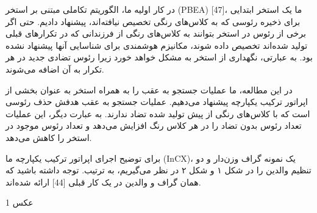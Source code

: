 \documentclass[a4paper,10pt]{article}
\begin{document}
                در کار اولیه ما، الگوریتم تکاملی مبتنی بر استخر (PBEA) [47]، ما یک استخر ابتدایی برای ذخیره رئوسی که به کلاس‌های رنگی تخصیص نیافته‌اند، پیشنهاد دادیم. حتی اگر برخی از رئوس در استخر بتوانند به کلاس‌های رنگی از فرزندانی که در تکرارهای قبلی تولید شده‌اند تخصیص داده شوند، مکانیزم هوشمندی برای شناسایی آنها پیشنهاد نشده بود. به عبارتی، نگهداری از استخر به مشکل خواهد خورد زیرا رئوس تضادی جدید در هر تکرار به آن اضافه می‌شوند.

                در این مطالعه، ما عملیات جستجو به عقب را به همراه استخر به عنوان بخشی از اپراتور ترکیب یکپارچه پیشنهاد می‌دهیم. عملیات جستجو به عقب هدفش حذف رئوسی است که با کلاس‌های رنگی از پیش تولید شده تضاد ندارند. به عبارت دیگر، این عملیات تعداد رئوس بدون تضاد را در هر کلاس رنگ افزایش می‌دهد و تعداد رئوس موجود در استخر را کاهش می‌دهد.

                برای توضیح اجرای اپراتور ترکیب یکپارچه ما (InCX)، یک نمونه گراف وزن‌دار و دو تنظیم والدین را در شکل ۱ و شکل ۲ در نظر می‌گیریم، به ترتیب. توجه داشته باشید که همان گراف و والدین در یک کار قبلی [44] ارائه شده‌اند.

                عکس 1

                
\end{document}
